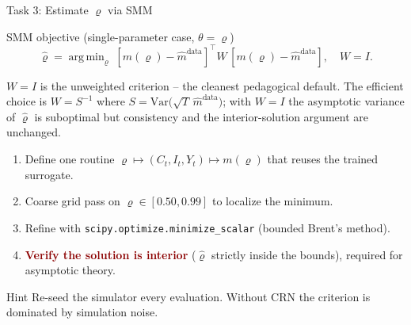 \documentclass[10pt,aspectratio=169]{beamer}
\newcommand{\emphc}[1]{\textbf{\textcolor{darkred}{#1}}}
\DeclareMathOperator*{\argmin}{arg\,min}
\begin{document}
\begin{frame}{Task 3: Estimate $\varrho$ via SMM}
\begin{block}{SMM objective (single-parameter case, $\theta = \varrho$)}
\vspace{-4pt}
\[\hat\varrho = \argmin_{\varrho}\; [m(\varrho) - \hat{m}^{\mathrm{data}}]^\top W \,[m(\varrho) - \hat{m}^{\mathrm{data}}], \quad W = I.\]
\vspace{-8pt}

{\scriptsize $W = I$ is the unweighted criterion -- the cleanest pedagogical default. The efficient choice is $W = S^{-1}$ where $S = \mathrm{Var}\bigl(\sqrt{T}\,\hat m^{\mathrm{data}}\bigr)$; with $W = I$ the asymptotic variance of $\hat\varrho$ is suboptimal but consistency and the interior-solution argument are unchanged.}
\end{block}
\begin{enumerate}
  \item Define one routine $\varrho \mapsto (C_t, I_t, Y_t) \mapsto m(\varrho)$ that reuses the trained surrogate.
  \item Coarse grid pass on $\varrho \in [0.50, 0.99]$ to localize the minimum.
  \item Refine with \texttt{scipy.optimize.minimize\_scalar} (bounded Brent's method).
  \item \emphc{Verify the solution is interior} ($\hat\varrho$ strictly inside the bounds), required for asymptotic theory.
\end{enumerate}
\begin{alertblock}{Hint}
Re-seed the simulator every evaluation. Without CRN the criterion is dominated by simulation noise.
\end{alertblock}
\end{frame}
\end{document}
